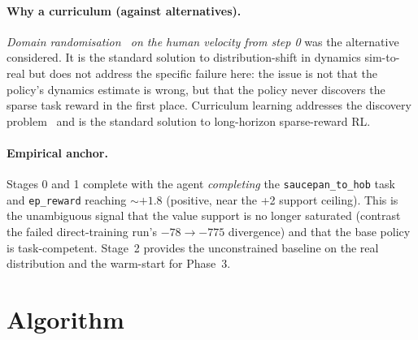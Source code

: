 \documentclass[11pt,a4paper]{report}
\begin{document}
\paragraph{Why a curriculum (against alternatives).}
\emph{Domain randomisation~\cite{tobin2017domainrand} on the human
velocity from step 0} was the alternative considered. It is the
standard solution to distribution-shift in dynamics sim-to-real
but does not address the specific failure here: the issue is not
that the policy's dynamics estimate is wrong, but that the policy
never discovers the sparse task reward in the first place.
Curriculum learning addresses the discovery
problem~\cite{narvekar2020curriculum,openai2019solving} and is the
standard solution to long-horizon sparse-reward RL.

\paragraph{Empirical anchor.}
Stages 0 and 1 complete with the agent \emph{completing} the
\texttt{saucepan\_to\_hob} task and \texttt{ep\_reward} reaching
$\sim +1.8$ (positive, near the +2 support ceiling). This is the
unambiguous signal that the value support is no longer saturated
(contrast the failed direct-training run's $-78 \to -775$
divergence) and that the base policy is task-competent. Stage~2
provides the unconstrained baseline on the real distribution and
the warm-start for Phase~3.


\section{Algorithm}
\label{sec:method:algorithm}
\end{document}
